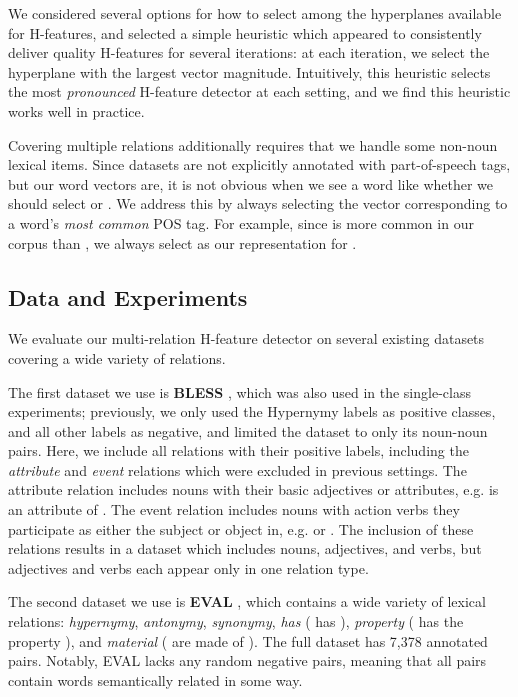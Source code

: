 We considered several options for how to select among the hyperplanes available
for H-features, and selected a simple heuristic which appeared to consistently
deliver quality H-features for several iterations: at each iteration, we select
the hyperplane with the largest vector magnitude. Intuitively, this heuristic
selects the most {\em pronounced} H-feature detector at each setting, and
we find this heuristic works well in practice.

Covering multiple relations additionally requires that we handle some
non-noun lexical items. Since datasets are not explicitly annotated with
part-of-speech tags, but our word vectors are, it is not obvious when we
see a word like  whether we should select  or
. We address this by always selecting the vector corresponding
to a word's {\em most common} POS tag. For example, since  is
more common in our corpus than , we always select 
as our representation for .

\subsection{Data and Experiments}

We evaluate our multi-relation H-feature detector on several existing datasets covering a wide variety of relations.

The first dataset we use is {\bf BLESS} \cite{baroni:2011:gems}, which was also used
in the single-class experiments; previously, we only used the Hypernymy labels
as positive classes, and all other labels as negative, and limited the dataset
to only its noun-noun pairs. Here, we include all relations with their positive
labels, including the {\em attribute} and {\em event} relations which were
excluded in previous settings. The attribute relation includes nouns with their
basic adjectives or attributes, e.g.  is an attribute of
. The event relation includes nouns with action verbs they participate
as either the subject or object in, e.g.  or . The inclusion of these relations results in a dataset which includes
nouns, adjectives, and verbs, but adjectives and verbs each appear only in one
relation type.

The second dataset we use is {\bf EVAL} \cite{santus:2015:ws}, which contains
a wide variety of lexical relations: {\em hypernymy}, {\em antonymy}, {\em
synonymy}, {\em has} ( has ), {\em property}
( has the property ), and {\em material} (
are {made of} ).  The full dataset has 7,378 annotated pairs.
Notably, EVAL lacks any random negative pairs, meaning that all pairs contain
words semantically related in some way.

